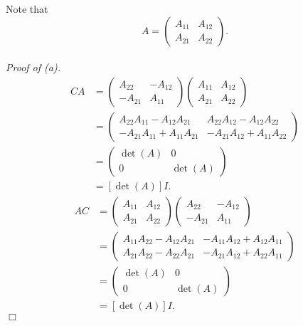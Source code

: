 \documentclass{article}
\begin{document}
Note that
$$A =
\begin{pmatrix}
A_{11} & A_{12} \\
A_{21} & A_{22}
\end{pmatrix}.$$ \\

\emph{Proof of (a).}
\begin{align*}
  CA
  &=
    \begin{pmatrix}
    A_{22} & -A_{12} \\
    -A_{21} & A_{11}
    \end{pmatrix}
    \begin{pmatrix}
    A_{11} & A_{12} \\
    A_{21} & A_{22}
    \end{pmatrix} \\
  &=
    \begin{pmatrix}
    A_{22}A_{11}-A_{12}A_{21}& A_{22}A_{12}-A_{12}A_{22} \\
    -A_{21}A_{11}+A_{11}A_{21} & -A_{21}A_{12}+A_{11}A_{22}
    \end{pmatrix} \\
  &=
    \begin{pmatrix}
    \det(A) & 0 \\
    0 & \det(A)
    \end{pmatrix} \\
  &= [\det(A)]I.
\end{align*}
\begin{align*}
  AC
  &=
    \begin{pmatrix}
    A_{11} & A_{12} \\
    A_{21} & A_{22}
    \end{pmatrix}
    \begin{pmatrix}
    A_{22} & -A_{12} \\
    -A_{21} & A_{11}
    \end{pmatrix} \\
  &=
    \begin{pmatrix}
    A_{11}A_{22}-A_{12}A_{21}& -A_{11}A_{12}+A_{12}A_{11} \\
    A_{21}A_{22}-A_{22}A_{21} & -A_{21}A_{12}+A_{22}A_{11}
    \end{pmatrix} \\
  &=
    \begin{pmatrix}
    \det(A) & 0 \\
    0 & \det(A)
    \end{pmatrix} \\
  &= [\det(A)]I.
\end{align*}
$\Box$ \\
\end{document}

